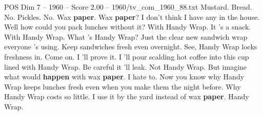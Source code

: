 \begin{textsample}{POS Dim 7 – 1960 – Score 2.00 – 1960/tv\_com\_1960\_88.txt}  \label{ex:f7_pos_030}
Mustard.
Bread.
No.
Pickles.
No.
Wax \textbf{paper}.
Wax \textbf{paper}?
I don't think I have any in the house.
Well how could you pack lunches without it?
With Handy Wrap.
It 's a snack.
With Handy Wrap.
What 's Handy Wrap?
Just the clear new sandwich wrap everyone 's using.
Keep sandwiches fresh even overnight.
See, Handy Wrap locks freshness in.
Come on.
I 'll prove it.
I 'll pour scalding hot coffee into this cup lined with Handy Wrap.
Be careful it 'll leak.
Not Handy Wrap.
But imagine what would \textbf{happen} with wax \textbf{paper}.
I hate to.
Now you know why Handy Wrap keeps lunches fresh even when you make them the night before.
Why Handy Wrap costs so little.
I use it by the yard instead of wax \textbf{paper}.
Handy Wrap.

\end{textsample}
